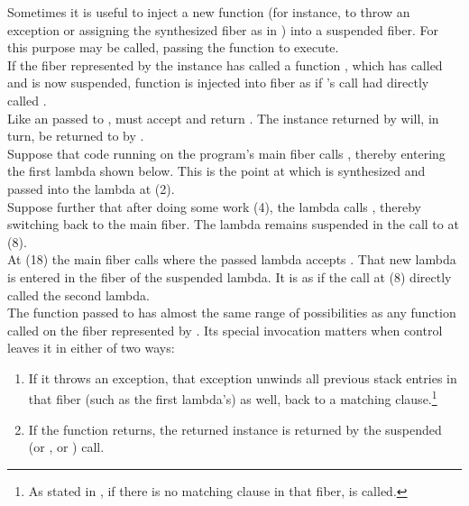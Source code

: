 \label{resumewith}
Sometimes it is useful to inject a new function (for instance, to throw an
exception or assigning the synthesized fiber as in ) into a
suspended fiber. For this purpose  may be called,
passing the function  to execute.\\
If the fiber represented by the \fiber instance  has called a function
, which has called \resume and is now suspended, function
 is injected into fiber  as if 's \resume call
had directly called .\\

Like an \entryfn passed to \fiber,  must accept  and
return \fiber. The \fiber instance returned by  will, in turn, be
returned to  by \resume.\\

Suppose that code running on the program's main fiber calls \resume, thereby
entering the first lambda shown below. This is the point at which  is
synthesized and passed into the lambda at (2).\\
Suppose further that after doing some work (4), the lambda calls
, thereby switching back to the main fiber. The lambda remains
suspended in the call to  at (8).\\
At (18) the main fiber calls  where the passed lambda
accepts . That new lambda is entered in the fiber of the suspended
lambda. It is as if the  call at (8) directly called the second
lambda.\\

The function passed to \resumewith has almost the same range of possibilities as
any function called on the fiber represented by . Its special invocation
matters when control leaves it in either of two ways:

\begin{enumerate}
  \item If it throws an exception, that exception unwinds all previous stack
        entries in that fiber (such as the first lambda's) as well, back to
        a matching  clause.\footnote{As stated
        in , if there is no matching 
        clause in that fiber,  is called.}
  \item If the function returns, the returned \fiber instance is returned by
        the suspended  (or \entryfn, or \resumewith) call.
\end{enumerate}

